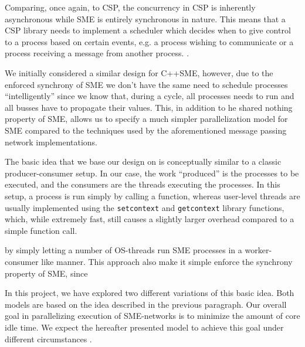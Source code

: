 Comparing, once again, to CSP, the concurrency in CSP is inherently
asynchronous while SME is entirely synchronous in nature. This means
that a CSP library needs to implement a scheduler which decides when
to give control to a process based on certain events, e.g. a process
wishing to communicate or a process receiving a message from another
process. .

We initially considered a similar design for C++SME, however, due to
the enforced synchrony of SME we don't have the same need to schedule
processes ``intelligently'' since we know that, during a cycle, all
processes needs to run and all busses have to propagate their
values. This, in addition to he shared nothing property of SME, allows
us to specify a much simpler parallelization model for SME compared to
the techniques used by the aforementioned message passing network
implementations.

The basic idea that we base our design on is conceptually similar to a
classic producer-consumer setup. In our case, the work ``produced'' is
the processes to be executed, and the consumers are the threads
executing the processes. In this setup, a process is run simply by
calling a function, whereas user-level threads are usually implemented
using the \texttt{setcontext} and \texttt{getcontext} library
functions, which, while extremely fast, still causes a slightly larger
overhead compared to a simple function call. 

by simply letting a number of OS-threads run SME processes in a
worker-consumer like manner. This approach also make it simple enforce
the synchrony property of SME, since 

In this project, we have explored two different variations of this
basic idea. Both models are based on the idea described in the
previous paragraph. Our overall goal in parallelizing execution of
SME-networks is to minimize the amount of core idle time. We expect
the hereafter presented model to achieve this goal under different
circumstances .




